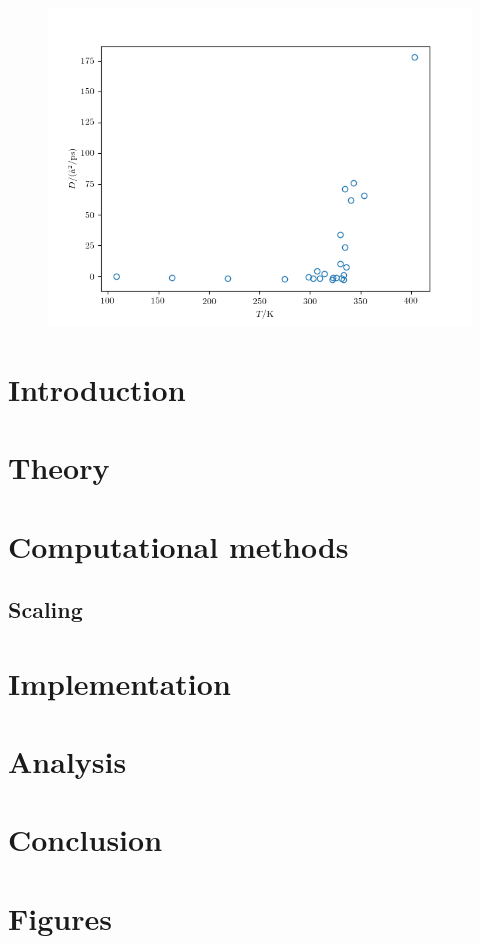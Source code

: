 \documentclass[fleqn]{scrartcl}
\begin{document}
	\begin{figure}
		\centering
		
		\caption{}
		\label{fig:flowchart}	
	\end{figure}

	\begin{figure}
		\centering
		\includegraphics{melt.png}
		\caption{}
		\label{fig:melt}	
	\end{figure}

	\section{Introduction}
	
	
	\section{Theory}
	

	\section{Computational methods}
	
	\subsection{Scaling}

	
	
	
	\section{Implementation}

	
	\section{Analysis}
	
	\section{Conclusion}
	
	\printbibliography
	
	\appendix
	\section{Figures}
	

	
\end{document}
